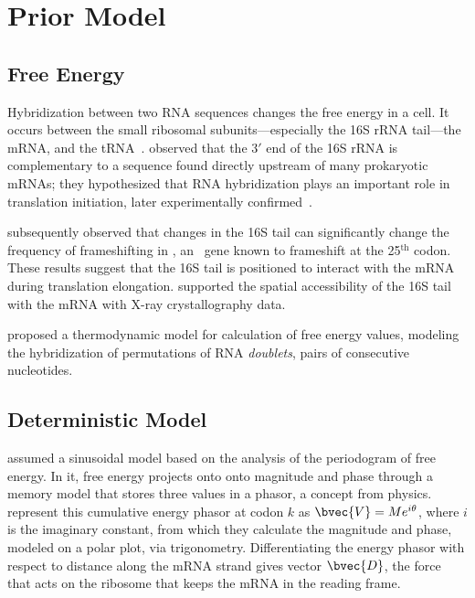 \documentclass[12pt]{article}
\begin{document}
\section{Prior Model}
\subsection{Free Energy}
\label{freeenergy}

Hybridization between two RNA sequences changes the free energy in a cell.
It occurs between the small
ribosomal subunits---especially the 16S rRNA tail---the mRNA, and the tRNA~\cite{starmer}.
\citet{sd} observed that the $3'$ end of the 16S rRNA is complementary to a sequence found 
directly upstream of many prokaryotic mRNAs; they hypothesized that RNA hybridization 
plays an important role in translation initiation, later
experimentally confirmed~\cite{hui,jacob}.

\citet{weiss87} subsequently observed that changes in the 16S tail can 
significantly change the frequency of frameshifting in \prfB, an \ecoli\ gene 
known to frameshift at the 25$^\textrm{th}$ codon.  These results suggest that 
the 16S tail is positioned to interact with the mRNA during translation elongation. 
\citet{xray} supported the spatial accessibility of the 16S tail with the mRNA with 
X-ray crystallography data.

\citet{freier} proposed a thermodynamic model for calculation of free energy values,
modeling the hybridization of permutations of RNA \emph{doublets}, pairs of consecutive nucleotides.

\subsection{Deterministic Model}
\citet{lalit:mechanics} assumed a sinusoidal model 
based on the analysis of the periodogram of free energy. In it,
free energy projects onto onto magnitude and
phase through a memory model that stores three values
in a phasor, a concept from physics. 
\citeauthor{lalit:mechanics} represent this cumulative energy phasor
at codon $k$ as $\bvec{V} = Me^{i\theta}$, where $i$ is the imaginary
constant, from which they calculate the magnitude and phase, modeled
on a polar plot, via
trigonometry. Differentiating the energy phasor
with respect to distance along the mRNA strand gives 
vector $\bvec{D}$, the force~\cite{lalit:mechanics}
that acts on the ribosome that keeps the mRNA in the reading frame.
 
\end{document}
